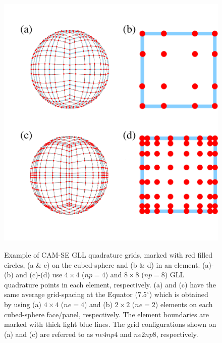 \documentclass[twocol]{ametsoc}
\begin{document}
\begin{figure}[t]
\begin{center}
\noindent\includegraphics[width=37pc,angle=0]{figs/quadrature-fig/gll.pdf}\\
\end{center}
\caption{Example of CAM-SE GLL quadrature grids, marked with red filled circles, (a \& c) on the cubed-sphere and (b \& d) in an element. (a)-(b) and (c)-(d) use $4\times 4$ ($np=4$) and $8\times 8$ ($np=8$) GLL quadrature points in each element, respectively. (a) and (c) have the same average grid-spacing at the Equator (7.5$^\circ$) which is obtained by using (a) $4\times 4$ ($ne=4$) and (b) $2\times 2$ ($ne=2$) elements on each cubed-sphere face/panel, respectively. The element boundaries are marked with thick light blue lines. The grid configurations shown on (a) and (c) are referred to as $ne4np4$ and $ne2np8$, respectively.}
\label{fig:gll-grids}
\end{figure}
\end{document}
